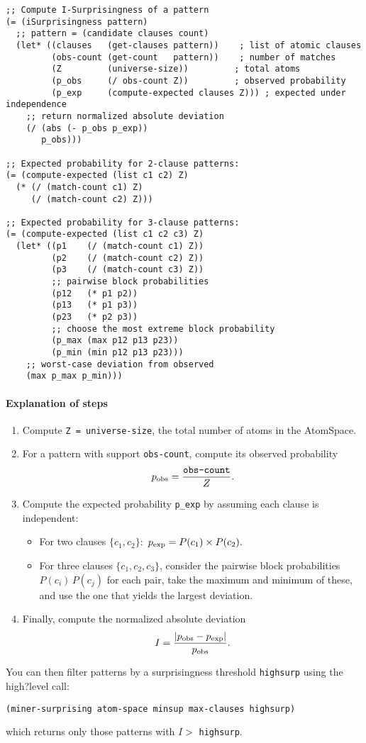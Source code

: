 \documentclass{article}
\begin{document}
\begin{verbatim}
;; Compute I-Surprisingness of a pattern
(= (iSurprisingness pattern)
  ;; pattern = (candidate clauses count)
  (let* ((clauses   (get-clauses pattern))    ; list of atomic clauses
         (obs-count (get-count   pattern))    ; number of matches
         (Z         (universe-size))         ; total atoms
         (p_obs     (/ obs-count Z))         ; observed probability
         (p_exp     (compute-expected clauses Z))) ; expected under independence
    ;; return normalized absolute deviation
    (/ (abs (- p_obs p_exp))
       p_obs)))

;; Expected probability for 2-clause patterns:
(= (compute-expected (list c1 c2) Z)
  (* (/ (match-count c1) Z)
     (/ (match-count c2) Z)))

;; Expected probability for 3-clause patterns:
(= (compute-expected (list c1 c2 c3) Z)
  (let* ((p1    (/ (match-count c1) Z))
         (p2    (/ (match-count c2) Z))
         (p3    (/ (match-count c3) Z))
         ;; pairwise block probabilities
         (p12   (* p1 p2))
         (p13   (* p1 p3))
         (p23   (* p2 p3))
         ;; choose the most extreme block probability
         (p_max (max p12 p13 p23))
         (p_min (min p12 p13 p23)))
    ;; worst-case deviation from observed
    (max p_max p_min)))
\end{verbatim}

\paragraph{Explanation of steps}

\begin{enumerate}
  \item Compute \texttt{Z = universe-size}, the total number of atoms in the AtomSpace.
  \item For a pattern with support \texttt{obs-count}, compute its observed probability
        \[
          p_{\rm obs} = \frac{\texttt{obs-count}}{Z}.
        \]
  \item Compute the expected probability \texttt{p\_exp} by assuming each clause is independent:
  \begin{itemize}
    \item For two clauses \(\{c_1,c_2\}\):
      \(\,p_{\rm exp} = P(c_1)\times P(c_2).\)
    \item For three clauses \(\{c_1,c_2,c_3\}\), consider the pairwise block probabilities
      \(P(c_i)\,P(c_j)\) for each pair, take the maximum and minimum of these, and use the one that yields the largest deviation.
  \end{itemize}
  \item Finally, compute the normalized absolute deviation
        \[
          I = \frac{\lvert p_{\rm obs} - p_{\rm exp}\rvert}{p_{\rm obs}}.
        \]
\end{enumerate}

You can then filter patterns by a surprisingness threshold \texttt{highsurp} using the high?level call:
\begin{verbatim}
(miner-surprising atom-space minsup max-clauses highsurp)
\end{verbatim}
which returns only those patterns with \(I >\) \texttt{highsurp}.
\end{document}
